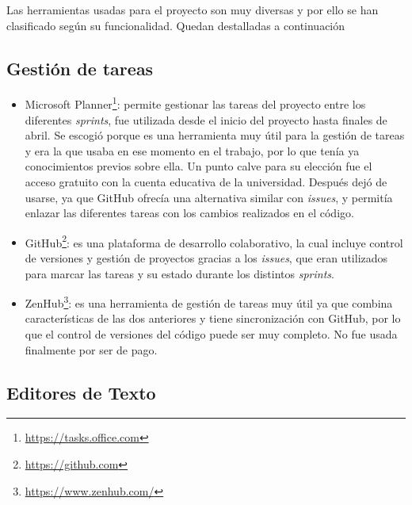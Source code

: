 Las herramientas usadas para el proyecto son muy diversas y por ello se han clasificado según su funcionalidad. Quedan destalladas a continuación

\subsection{Gestión de tareas}\label{gestión-de-tareas}

\begin{itemize}
    \item Microsoft Planner\label{planner}\footnote{\url{https://tasks.office.com}}: permite gestionar las tareas del proyecto entre los diferentes \textit{sprints}, fue utilizada desde el inicio del proyecto hasta finales de abril. Se escogió porque es una herramienta muy útil para la gestión de tareas y era la que usaba en ese momento en el trabajo, por lo que tenía ya conocimientos previos sobre ella. Un punto calve para su elección fue el acceso gratuito con la cuenta educativa de la universidad. Después dejó de usarse, ya que GitHub ofrecía una alternativa similar con \textit{issues}, y permitía enlazar las diferentes tareas con los cambios realizados en el código.
    \item GitHub\footnote{\url{https://github.com}}: es una plataforma de desarrollo colaborativo, la cual incluye control de versiones y gestión de proyectos gracias a los \textit{issues}, que eran utilizados para marcar las tareas y su estado durante los distintos \textit{sprints}.
    \item ZenHub\footnote{\url{https://www.zenhub.com/}}: es una herramienta de gestión de tareas muy útil ya que combina características de las dos anteriores y tiene sincronización con GitHub, por lo que el control de versiones del código puede ser muy completo. No fue usada finalmente por ser de pago.
\end{itemize}


\subsection{Editores de Texto}

